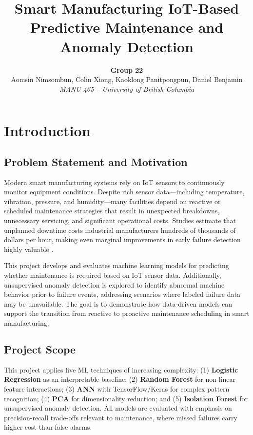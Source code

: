 \documentclass[11pt]{article}
\title{\textbf{Smart Manufacturing IoT-Based Predictive Maintenance and Anomaly Detection}}
\author{
\textbf{Group 22} \\
Aomsin Nimsombun, Colin Xiong, Kaoklong Panitpongpun, Daniel Benjamin \\
\textit{MANU 465 -- University of British Columbia}
}
\date{}
\begin{document}
\maketitle

\section{Introduction}

\subsection{Problem Statement and Motivation}

Modern smart manufacturing systems rely on IoT sensors to continuously monitor equipment conditions. Despite rich sensor data---including temperature, vibration, pressure, and humidity---many facilities depend on reactive or scheduled maintenance strategies that result in unexpected breakdowns, unnecessary servicing, and significant operational costs. Studies estimate that unplanned downtime costs industrial manufacturers hundreds of thousands of dollars per hour, making even marginal improvements in early failure detection highly valuable \cite{mobley2002introduction}.

This project develops and evaluates machine learning models for predicting whether maintenance is required based on IoT sensor data. Additionally, unsupervised anomaly detection is explored to identify abnormal machine behavior prior to failure events, addressing scenarios where labeled failure data may be unavailable. The goal is to demonstrate how data-driven models can support the transition from reactive to proactive maintenance scheduling in smart manufacturing.

\subsection{Project Scope}

This project applies five ML techniques of increasing complexity: (1) \textbf{Logistic Regression} as an interpretable baseline; (2) \textbf{Random Forest} for non-linear feature interactions; (3) \textbf{ANN} with TensorFlow/Keras for complex pattern recognition; (4) \textbf{PCA} for dimensionality reduction; and (5) \textbf{Isolation Forest} for unsupervised anomaly detection. All models are evaluated with emphasis on precision-recall trade-offs relevant to maintenance, where missed failures carry higher cost than false alarms.
\end{document}
